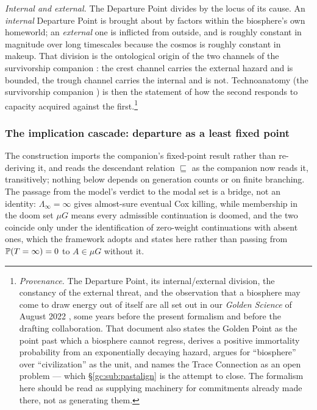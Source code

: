 \begin{definition}
\emph{Internal and external.} The Departure Point divides by the
locus of its cause. An \emph{internal} Departure Point is brought about
by factors within the biosphere's own homeworld; an \emph{external} one
is inflicted from outside, and is roughly constant in magnitude over
long timescales because the cosmos is roughly constant in makeup. That
division is the ontological origin of the two channels of
the survivorship companion \cite{GoldenSurvivorship}: the crest channel carries the external hazard and
is bounded, the trough channel carries the internal and is not.
Technoanatomy (the survivorship companion \cite{GoldenSurvivorship}) is then the statement
of how the second responds to capacity acquired against the
first.\footnote{\emph{Provenance.} The Departure Point, its
internal/external division, the constancy of the external threat, and
the observation that a biosphere may come to draw energy out of itself
are all set out in our \emph{Golden Science} of August 2022
\cite{GoldenScience2022}, some years before the present formalism and
before the drafting collaboration. That document also states the Golden Point as the point
past which a biosphere cannot regress, derives a positive immortality
probability from an exponentially decaying hazard, argues for
``biosphere'' over ``civilization'' as the unit, and names the Trace
Connection as an open problem --- which \S\ref{gc:sub:pastalign} is the
attempt to close. The formalism here should be read as supplying
machinery for commitments already made there, not as generating
them.}
\end{definition}

\subsubsection{The implication cascade: departure as a least fixed point}
\label{gc:subsub:cascade}

The construction imports the companion's fixed-point result rather
than re-deriving it, and reads the descendant relation $\sqsubseteq$
as the companion now reads it, transitively; nothing below depends on
generation counts or on finite branching. The passage from the model's
verdict to the modal set is a bridge, not an identity: $\Lambda_\infty=\infty$ gives almost-sure eventual Cox
killing, while membership in the doom set $\mu G$ means every
admissible continuation is doomed, and the two coincide only under the
identification of zero-weight continuations with absent ones, which
the framework adopts and states here rather than passing from
$\mathbb{P}(T=\infty)=0$ to $A\in\mu G$ without it.

